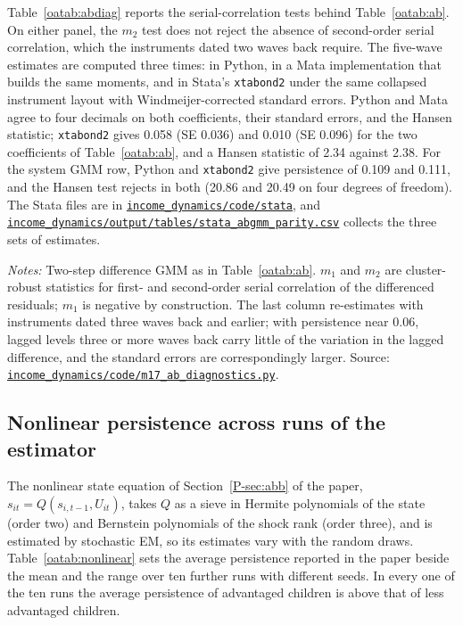 \documentclass[11pt]{article}
\numberwithin{equation}{section}
\newcommand{\repourl}{https://github.com/JiachenJin1001/before-the-labor-market-or-inside-it}
\newcommand{\code}[1]{\href{\repourl/blob/main/#1}{\nolinkurl{#1}}}
\newcommand{\folder}[1]{\href{\repourl/tree/main/#1}{\nolinkurl{#1}}}
\begin{document}
Table~\ref{oatab:abdiag} reports the serial-correlation tests behind
Table~\ref{oatab:ab}. On either panel, the $m_2$ test does not reject the absence of second-order serial correlation, which the instruments dated two waves back require. The five-wave estimates are computed three times: in Python, in a Mata implementation that builds the same moments, and in Stata's \texttt{xtabond2} under the same collapsed instrument layout with Windmeijer-corrected standard errors. Python and Mata agree to four decimals on both coefficients, their standard errors, and the Hansen statistic; \texttt{xtabond2} gives 0.058 (SE 0.036) and 0.010 (SE 0.096) for the two coefficients of Table~\ref{oatab:ab}, and a Hansen statistic of 2.34 against 2.38. For the system GMM row, Python and \texttt{xtabond2} give persistence of 0.109 and 0.111, and the Hansen test rejects in both (20.86 and 20.49 on four degrees of freedom). The Stata files are in \folder{income_dynamics/code/stata}, and \code{income_dynamics/output/tables/stata_abgmm_parity.csv} collects the three sets of estimates.

\begin{table}[H]
\centering
\small
\caption{Serial-correlation tests for the Arellano--Bond estimates.}
\label{oatab:abdiag}
\setlength{\tabcolsep}{4pt}

\par\smallskip
\begin{minipage}{0.94\textwidth}
\footnotesize\emph{Notes:} Two-step difference GMM as in
Table~\ref{oatab:ab}. $m_1$ and $m_2$ are cluster-robust
statistics for first- and second-order serial correlation of the
differenced residuals; $m_1$ is negative by construction. The last column re-estimates with instruments dated three waves back and earlier; with persistence near 0.06, lagged levels three or more waves back carry little of the variation in the lagged difference, and the standard errors are correspondingly larger. Source:
\code{income_dynamics/code/m17_ab_diagnostics.py}.
\end{minipage}
\end{table}

\subsection{Nonlinear persistence across runs of the estimator}
\label{oa:nonlinear}

The nonlinear state equation of Section~\ref{P-sec:abb} of the paper, $s_{it} = Q(s_{i,t-1}, U_{it})$, takes $Q$ as a sieve in Hermite polynomials of the state (order two) and Bernstein polynomials of the shock rank (order three), and is estimated by stochastic EM, so its estimates vary with the random draws. Table~\ref{oatab:nonlinear} sets the average persistence reported in the paper beside the mean and the range over ten further runs with different seeds. In every one of the ten runs the average persistence of advantaged children is above that of less advantaged children.
\end{document}

